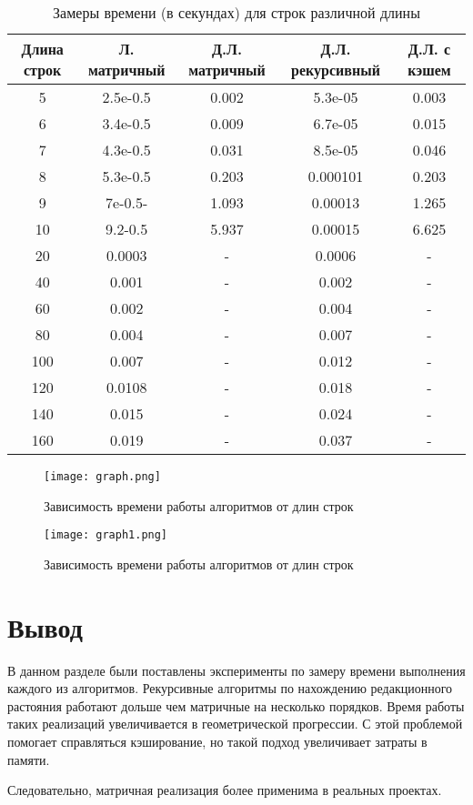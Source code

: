 \begin{table}[h]
	\begin{center}
		\caption{\label{table:time} Замеры времени (в секундах) для строк различной длины}
		\begin{tabular}{|c c c c c|} 
			\hline
			Длина строк & Л. матричный & Д.Л. матричный & Д.Л. рекурсивный & Д.Л. с кэшем\\ [0.5ex] 
			\hline\hline
			5 & 2.5e-0.5 & 0.002 & 5.3e-05 & 0.003\\
			\hline
			6 & 3.4e-0.5 & 0.009 & 6.7e-05 & 0.015\\
			\hline
			7 & 4.3e-0.5 & 0.031 & 8.5e-05 & 0.046\\
			\hline
			8 & 5.3e-0.5 & 0.203 & 0.000101 & 0.203\\
			\hline
			9 & 7e-0.5- & 1.093 & 0.00013 & 1.265\\
			\hline
			10 & 9.2-0.5 & 5.937 & 0.00015 & 6.625\\
			\hline
			20 & 0.0003 & - & 0.0006 & -\\
			\hline
			40 & 0.001 & - & 0.002 & -\\
			\hline
			60 & 0.002 & - & 0.004 & -\\
			\hline
			80 & 0.004 & - & 0.007 & -\\
			\hline
			100 & 0.007 & - & 0.012 & -\\
			\hline
			120 & 0.0108 & - & 0.018 & -\\
			\hline
			140 & 0.015 & - & 0.024 & -\\
			\hline
			160 & 0.019 & - & 0.037 & -\\
			\hline
		\end{tabular}
	\end{center}
\end{table}
        \begin{figure}[h!]
            \centering
            \texttt{[image: graph.png]}
            \caption{Зависимость времени работы алгоритмов от длин строк}
            \label{graph:test:1}

            \texttt{[image: graph1.png]}
            \caption{Зависимость времени работы алгоритмов от длин строк}
            \label{graph:test:2}
        \end{figure}



    \section{Вывод}
        В данном разделе были поставлены эксперименты по замеру времени
        выполнения каждого из алгоритмов. Рекурсивные алгоритмы по нахождению редакционного растояния работают дольше чем матричные на несколько порядков. Время работы таких реализаций увеличивается в геометрической прогрессии. С этой проблемой помогает справляться кэширование, но такой подход увеличивает затраты в памяти. 
        
        Следовательно, матричная реализация более применима в реальных проектах.


\newpage